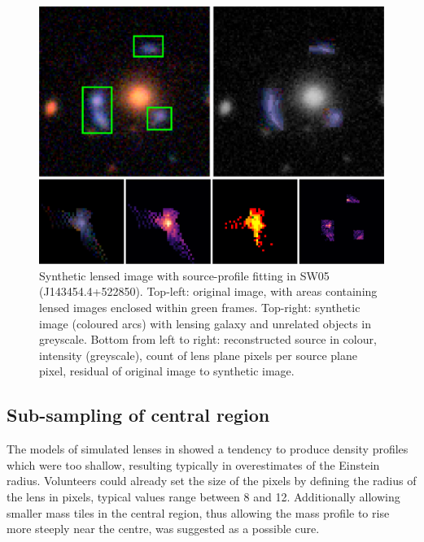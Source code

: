 \begin{figure}
  \includegraphics[width=\linewidth]{img/new_synth_img_detailed}
  \caption{Synthetic lensed image with source-profile fitting in SW05
    (J143454.4+522850). Top-left: original image, with areas
    containing lensed images enclosed within green frames.  Top-right:
    synthetic image (coloured arcs) with lensing galaxy and unrelated
    objects in greyscale.  Bottom from left to right: reconstructed
    source in colour, intensity (greyscale), count of lens plane
    pixels per source plane pixel, residual of original image to
    synthetic image.}
  \label{fig:synthimg}
\end{figure}


\subsection{Sub-sampling of central region}\label{subsec:hires}

The models of simulated lenses in \cite{2015MNRAS.447.2170K} showed a tendency 
to produce density profiles which were too shallow, resulting typically in 
overestimates of the Einstein radius. Volunteers could already set the size of 
the pixels by defining the radius of the lens in pixels, typical values range 
between 8 and 12. Additionally allowing smaller mass tiles in the central 
region, thus allowing the mass profile to rise more steeply near the centre, 
was suggested as a possible cure.

